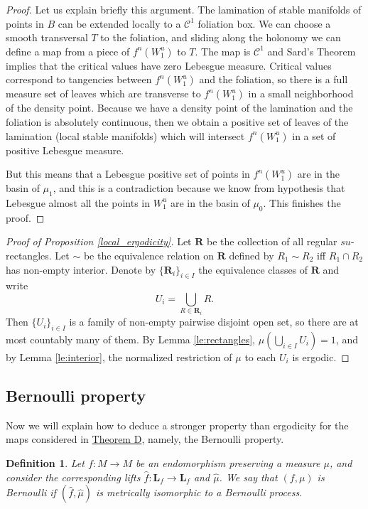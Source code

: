 \documentclass[11pt,letterpaper,reqno]{article}
\newtheorem{definition}{Definition}[section]
\newcommand{\hTTf}[1][f]{\mathbf{L}_{#1}}
\begin{document}
\begin{proof}
Let us explain briefly this argument. The lamination of stable manifolds of points in $B$ can be extended locally to a $\mathcal C^1$ foliation box. We can choose a smooth transversal $T$ to the foliation, and sliding along the holonomy we can define a map from a piece of $f^n(W^u_1)$ to $T$. The map is $\mathcal C^1$ and Sard's Theorem implies that the critical values have zero Lebesgue measure. Critical values correspond to tangencies between $f^n(W^u_1)$ and the foliation, so there is a full measure set of leaves which are transverse to $f^n(W^u_1)$ in a small neighborhood of the density point. Because we have a density point of the lamination and the foliation is absolutely continuous, then we obtain a positive set of leaves of the lamination (local stable manifolds) which will intersect $f^n(W^u_1)$ in a set of positive Lebesgue measure.
 
But this means that a Lebesgue positive set of points in $f^n(W^u_1)$ are in the basin of $\mu_1$, and this is a contradiction because we know from hypothesis that Lebesgue almost all the points in $W^u_1$ are in the basin of $\mu_0$. This finishes the proof.
\end{proof}

\begin{proof}[Proof of Proposition \ref{local_ergodicity}]
	Let $\mathbf{R}$ be the collection of all regular $su$-rectangles. Let $\sim$ be the equivalence relation on $\mathbf{R}$ defined by $R_1 \sim R_2$ iff $R_1 \cap R_2$ has non-empty interior. Denote by $\{\mathbf{R}_i\}_{i \in I}$ the equivalence classes of $\mathbf{R}$ and write
	\[ U_i = \bigcup_{R \in \mathbf{R}_i} R.\]
	Then $\{U_i\}_{i \in I}$ is a family of non-empty pairwise disjoint open set, so there are at most countably many of them. By Lemma \ref{le:rectangles}, $\mu(\bigcup_{i \in I} U_i) = 1$, and by Lemma \ref{le:interior}, the normalized restriction of $\mu$ to each $U_i$ is ergodic.
\end{proof}



\subsection{Bernoulli property} %
\label{sub:bernoulli_property}

Now we will explain how to deduce a stronger property than ergodicity for the maps considered in \hyperlink{theoremD}{Theorem D}, namely, the Bernoulli property. 

\begin{definition}
Let $f:M\to M$ be an endomorphism preserving a measure $\mu$, and consider the corresponding lifts $\hat f:\hTTf\to\hTTf$ and $\hat \mu$. We say that $(f,\mu)$ is Bernoulli if $(\hat f,\hat \mu)$ is metrically isomorphic to a Bernoulli process.
\end{definition}
\end{document}
